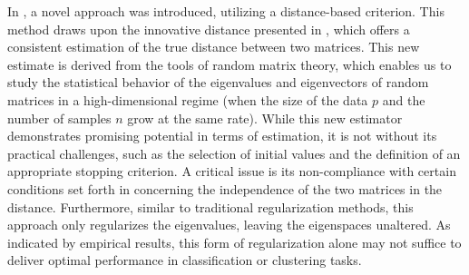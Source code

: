 \documentclass{article}
\theoremstyle{plain}
\theoremstyle{definition}
\theoremstyle{remark}
\begin{document}
In \cite{tiomoko2019random}, a novel approach was introduced, utilizing a distance-based criterion. This method draws upon the innovative distance presented in \cite{couillet2019random}, which offers a consistent estimation of the true distance between two matrices. This new estimate is derived from the tools of random matrix theory, which enables us to study the statistical behavior of the eigenvalues and eigenvectors of random matrices in a high-dimensional regime (when the size of the data $p$ and the number of samples $n$ grow at the same rate). While this new estimator demonstrates promising potential in terms of estimation, it is not without its practical challenges, such as the selection of initial values and the definition of an appropriate stopping criterion. A critical issue is its non-compliance with certain conditions set forth in \cite{tiomoko2019random} concerning the independence of the two matrices in the distance. Furthermore, similar to traditional regularization methods, this approach only regularizes the eigenvalues, leaving the eigenspaces unaltered. As indicated by empirical results, this form of regularization alone may not suffice to deliver optimal performance in classification or clustering tasks.

\end{document}
